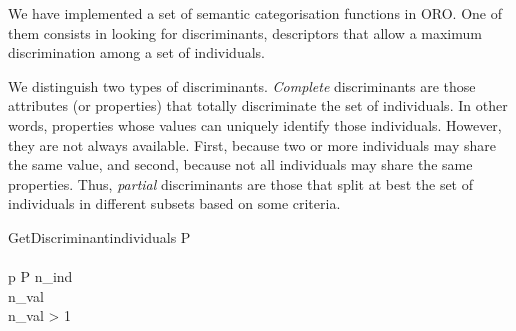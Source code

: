 We have implemented a set of semantic categorisation functions in ORO. One of
them consists in looking for discriminants, \ie descriptors that allow a
maximum discrimination among a set of individuals.

We distinguish two types of discriminants. \emph{Complete} discriminants are
those attributes (or properties) that totally discriminate the set of
individuals. In other words, properties whose values can uniquely identify
those individuals. However, they are not always available. First, because two
or more individuals may share the same value, and second, because not all
individuals may share the same properties. Thus, \emph{partial} discriminants
are those that split at best the set of individuals in different subsets
based on some criteria.

\small
\begin{pseudocode}[ruled]{GetDiscriminant}{individuals}
\label{algo|discriminant}
\BEGIN
P \GETS {} \\
 \GETS \emptyset \\
\FOREACH p \in P \DO
    \BEGIN
        n_{ind} \GETS {} \\
        n_{val} \GETS {} \\
        \IF n_{val} > 1 \THEN
             \GETS {} \\
    \END \\

 \\
 \\
\END

\end{pseudocode}
\normalsize

